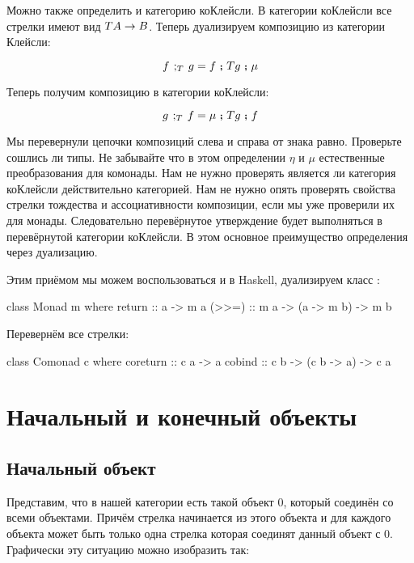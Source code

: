 Можно также определить и категорию коКлейсли. В категории коКлейсли все
стрелки имеют вид $TA \rightarrow B$. Теперь дуализируем композицию из категории
Клейсли:

\[f \textbf{~$;_{T}$~} g = f \footnotesize\textbf{~;~}\normalsize Tg \footnotesize\textbf{~;~}\normalsize \mu\]

Теперь получим композицию в категории коКлейсли:

\[g \textbf{~$;_{T}$~} f = \mu \footnotesize\textbf{~;~}\normalsize Tg \footnotesize\textbf{~;~}\normalsize f\]

Мы перевернули цепочки композиций слева и справа от знака равно.
Проверьте сошлись ли типы. Не забывайте что в этом определении $\eta$ и
$\mu$ естественные преобразования для комонады. Нам не нужно проверять
является ли категория коКлейсли действительно категорией. Нам не нужно
опять проверять свойства стрелки тождества и ассоциативности композиции,
если мы уже проверили их для монады. Следовательно перевёрнутое
утверждение будет выполняться в перевёрнутой категории коКлейсли. В этом
основное преимущество определения через дуализацию.

Этим приёмом мы можем воспользоваться и в Haskell, дуализируем класс
:


\begin{code}
class Monad m where
    return  :: a -> m a
    (>>=)   :: m a -> (a -> m b) -> m b
\end{code}

Перевернём все стрелки:


\begin{code}
class Comonad c where
    coreturn    :: c a -> a
    cobind      :: c b -> (c b -> a) -> c a
\end{code}

\section{Начальный и конечный объекты}

\subsection{Начальный объект}

Представим, что в нашей категории есть такой объект $0$, который
соединён со всеми объектами. Причём стрелка начинается из этого объекта
и для каждого объекта может быть только одна стрелка которая соединят
данный объект с $0$. Графически эту ситуацию можно изобразить так:

\begin{centering}



\end{centering}

